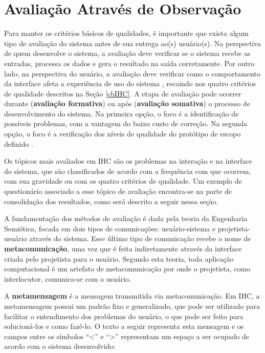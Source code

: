 \section{Avaliação Através de Observação} \label{avaObs}

\indent Para manter os critérios básicos de qualidades, é importante que exista algum tipo de avaliação do sistema antes de sua entrega ao(s) usuário(s). Na perspectiva de quem desenvolve o sistema, a avaliação deve verificar se o sistema recebe as entradas, processa os dados e gera o resultado na saída corretamente. Por outro lado, na perspectiva do usuário, a avaliação deve verificar como o comportamento da interface afeta a experiência de uso do sistema \cite{IHCbook}, recaindo nos quatro critérios de qualidade descritos na Seção \ref{cbIHC}. A etapa de avaliação pode ocorrer durante (\textbf{avaliação formativa}) ou após (\textbf{avaliação somativa}) o processo de desenvolvimento do sistema. Na primeira opção, o foco é a identificação de possíveis problemas, com a vantagem do baixo custo de correção. Na segunda opção, o foco é a verificação dos níveis de qualidade do protótipo de escopo definido \cite{IHCbook}.

\indent Os tópicos mais avaliados em IHC são os problemas na interação e na interface do sistema, que são classificados de acordo com a frequência com que ocorrem, com sua gravidade ou com os quatro critérios de qualidade. Um exemplo de questionário associado a esse tópico de avaliação encontra-se na parte de consolidação dos resultados, como será descrito a seguir nessa seção.

\indent A fundamentação dos métodos de avaliação é dada pela teoria da Engenharia Semiótica, focada em dois tipos de comunicações: usuário-sistema e projetista-usuário através do sistema. Esse último tipo de comunicação recebe o nome de \textbf{metacomunicação}, uma vez que é feita indiretamente através da interface criada pelo projetista para o usuário. Segundo esta teoria, toda aplicação computacional é um artefato de metacomunicação por onde o projetista, como interlocutor, comunica-se com o usuário.

\indent A \textbf{metamensagem} é a mensagem transmitida via metacomunicação. Em IHC, a metamensagem possui um padrão fixo e generalizado, que pode ser utilizado para facilitar o entendimento dos problemas do usuário, o que pode ser feito para solucioná-los e como fazê-lo. O texto a seguir representa esta mensagem e os campos entre os símbolos ``<'' e ``>'' representam um espaço a ser ocupado de acordo com o sistema desenvolvido:

